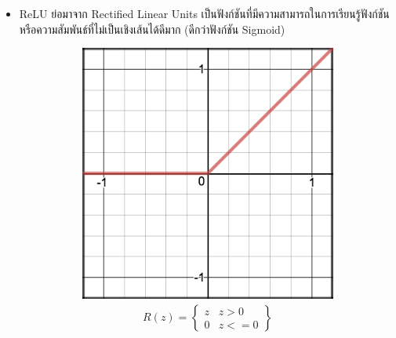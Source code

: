 \begin{itemize}
    \item ReLU ย่อมาจาก Rectified Linear Units เป็นฟังก์ชันที่มีความสามารถในการเรียนรู้ฟังก์ชันหรือความสัมพันธ์ที่ไม่เป็นเชิงเส้นได้ดีมาก 
    (ดีกว่าฟังก์ชัน Sigmoid)
    \begin{figure}[H]
        \centering
        \begin{subfigure}{0.5\textwidth}
            \centering
            \includegraphics[width=0.9\linewidth]{fig/actfunc_relu.png}
            \caption{%
                \begin{equation}
                    \begin{split}R(z) = \begin{Bmatrix} z & z > 0 \\
                        0 & z <= 0 \end{Bmatrix}\end{split}
                \end{equation}
            }
            \label{fig:actfunc_relu}
        \end{subfigure}%
        \begin{subfigure}{0.5\textwidth}
            \centering

\end{subfigure}
\end{figure}
\end{itemize}
